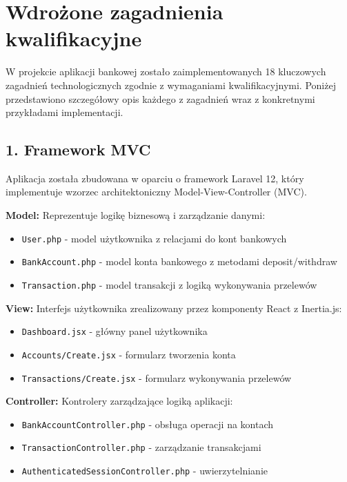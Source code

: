 \documentclass[12pt,a4paper]{article}
\begin{document}
    \section{Wdrożone zagadnienia kwalifikacyjne}

    W projekcie aplikacji bankowej zostało zaimplementowanych 18 kluczowych zagadnień technologicznych zgodnie z wymaganiami kwalifikacyjnymi. Poniżej przedstawiono szczegółowy opis każdego z zagadnień wraz z konkretnymi przykładami implementacji.

    \subsection{1. Framework MVC}

    Aplikacja została zbudowana w oparciu o framework Laravel 12, który implementuje wzorzec architektoniczny Model-View-Controller (MVC).

    \textbf{Model:} Reprezentuje logikę biznesową i zarządzanie danymi:
    \begin{itemize}
        \item \texttt{User.php} - model użytkownika z relacjami do kont bankowych
        \item \texttt{BankAccount.php} - model konta bankowego z metodami deposit/withdraw
        \item \texttt{Transaction.php} - model transakcji z logiką wykonywania przelewów
    \end{itemize}

    \textbf{View:} Interfejs użytkownika zrealizowany przez komponenty React z Inertia.js:
    \begin{itemize}
        \item \texttt{Dashboard.jsx} - główny panel użytkownika
        \item \texttt{Accounts/Create.jsx} - formularz tworzenia konta
        \item \texttt{Transactions/Create.jsx} - formularz wykonywania przelewów
    \end{itemize}

    \textbf{Controller:} Kontrolery zarządzające logiką aplikacji:
    \begin{itemize}
        \item \texttt{BankAccountController.php} - obsługa operacji na kontach
        \item \texttt{TransactionController.php} - zarządzanie transakcjami
        \item \texttt{AuthenticatedSessionController.php} - uwierzytelnianie
    \end{itemize}
\end{document}
